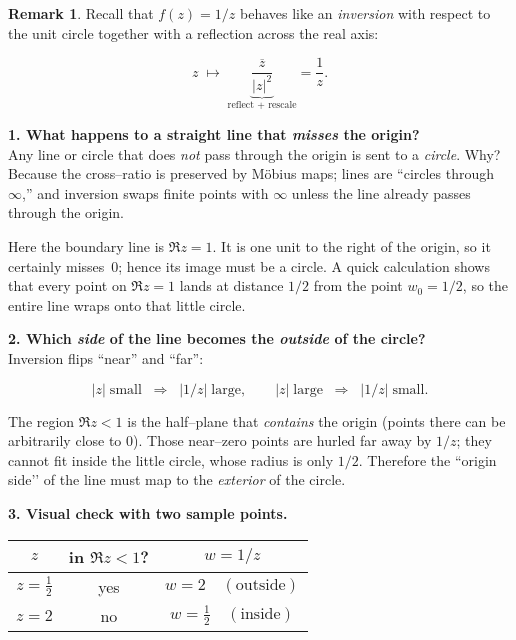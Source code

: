 \documentclass[12pt]{article}
\theoremstyle{definition} %
\newtheorem{remark}{Remark}
\theoremstyle{plain} %
\begin{document}
      \begin{remark}
         Recall that \(f(z)=1/z\) behaves like an \emph{inversion} with respect
         to the unit circle together with a reflection across the real axis:
         
         \[
             z \;\longmapsto\; \underbrace{\frac{\overline{z}}{|z|^{2}}}_{\text{reflect + rescale}}
                              =\frac{1}{z}.
         \]
         
         \textbf{1.  What happens to a straight line that \emph{misses} the
         origin?}\\
         Any line or circle that does \emph{not} pass through the origin is
         sent to a \emph{circle}.  
         Why?  Because the cross–ratio is preserved by Möbius maps; lines are
         “circles through $\infty$,” and inversion swaps
         finite points with \(\infty\) unless the line already passes through
         the origin.
         
         Here the boundary line is \(\Re z = 1\).  
         It is one unit to the right of the origin, so it certainly misses~\(0\);
         hence its image must be a circle.  
         A quick calculation shows that every point on \(\Re z=1\) lands at
         distance \(1/2\) from the point \(w_{0}=1/2\), so the entire line
         wraps onto that little circle.
         
         \textbf{2.  Which \emph{side} of the line becomes the \emph{outside}
         of the circle?}\\
         Inversion flips “near” and “far”:
         
         \[
            |z|\;\text{small} \;\;\Longrightarrow\;\;
            |1/z|\;\text{large},
            \qquad
            |z|\;\text{large} \;\;\Longrightarrow\;\;
            |1/z|\;\text{small}.
         \]
         
         The region \(\Re z<1\) is the half–plane that \emph{contains} the
         origin (points there can be arbitrarily close to \(0\)).
         Those near–zero points are hurled far away by \(1/z\);
         they cannot fit inside the little circle, whose radius is only \(1/2\).
         Therefore the “origin side’’ of the line must map to the
         \emph{exterior} of the circle.
         
         \textbf{3.  Visual check with two sample points.}
         
         \begin{center}
         \begin{tabular}{c|c|c}
         \(z\) & in \(\Re z<1\)? & \(w=1/z\) \\
         \hline
         \( z = \tfrac12\)      & yes & \( w = 2     \quad (\text{outside})\) \\
         \( z = 2             \) & no  & \( w = \tfrac12\quad(\text{inside})\)
         \end{tabular}
         \end{center}
         

\end{remark}
\end{document}
